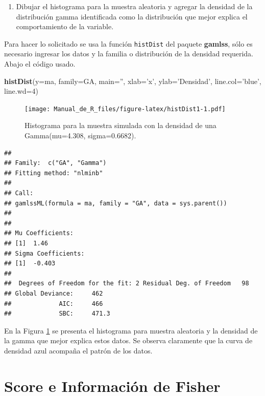 \documentclass[10pt,]{krantz}
\makeatletter
\newenvironment{Shaded}{\begin{snugshade}}{\end{snugshade}}
\newcommand{\KeywordTok}[1]{\textcolor[rgb]{0.13,0.29,0.53}{\textbf{#1}}}
\newcommand{\DataTypeTok}[1]{\textcolor[rgb]{0.13,0.29,0.53}{#1}}
\newcommand{\DecValTok}[1]{\textcolor[rgb]{0.00,0.00,0.81}{#1}}
\newcommand{\StringTok}[1]{\textcolor[rgb]{0.31,0.60,0.02}{#1}}
\newcommand{\NormalTok}[1]{#1}
\providecommand{\tightlist}{%
  \setlength{\itemsep}{0pt}\setlength{\parskip}{0pt}}
\newenvironment{kframe}{%
\medskip{}
\setlength{\fboxsep}{.8em}
 \def\at@end@of@kframe{}%
 \ifinner\ifhmode%
  \def\at@end@of@kframe{\end{minipage}}%
  \begin{minipage}{\columnwidth}%
 \fi\fi%
 \def\FrameCommand##1{\hskip\@totalleftmargin \hskip-\fboxsep
 \colorbox{shadecolor}{##1}\hskip-\fboxsep
     \hskip-\linewidth \hskip-\@totalleftmargin \hskip\columnwidth}%
 \MakeFramed {\advance\hsize-\width
   \@totalleftmargin\z@ \linewidth\hsize
   \@setminipage}}%
 {\par\unskip\endMakeFramed%
 \at@end@of@kframe}
\renewenvironment{Shaded}{\begin{kframe}}{\end{kframe}}
\makeatother
\begin{document}
\begin{enumerate}
\def\labelenumi{\arabic{enumi})}
\setcounter{enumi}{2}
\tightlist
\item
  Dibujar el histograma para la muestra aleatoria y agregar la densidad
  de la distribución gamma identificada como la distribución que mejor
  explica el comportamiento de la variable.
\end{enumerate}

Para hacer lo solicitado se usa la función \texttt{histDist} del paquete
\textbf{gamlss}, sólo es necesario ingresar los datos y la familia o
distribución de la densidad requerida. Abajo el código usado.

\begin{Shaded}
\begin{Highlighting}[]
\KeywordTok{histDist}\NormalTok{(}\DataTypeTok{y=}\NormalTok{ma, }\DataTypeTok{family=}\NormalTok{GA, }\DataTypeTok{main=}\StringTok{''}\NormalTok{, }\DataTypeTok{xlab=}\StringTok{'x'}\NormalTok{, }\DataTypeTok{ylab=}\StringTok{'Densidad'}\NormalTok{,}
         \DataTypeTok{line.col=}\StringTok{'blue'}\NormalTok{, }\DataTypeTok{line.wd=}\DecValTok{4}\NormalTok{)}
\end{Highlighting}
\end{Shaded}

\begin{figure}
\centering
\texttt{[image: Manual\_de\_R\_files/figure-latex/histDist1-1.pdf]}
\caption{\label{fig:histDist1}Histograma para la muestra simulada con la
densidad de una Gamma(mu=4.308, sigma=0.6682).}
\end{figure}

\begin{verbatim}
## 
## Family:  c("GA", "Gamma") 
## Fitting method: "nlminb" 
## 
## Call:  
## gamlssML(formula = ma, family = "GA", data = sys.parent()) 
## 
## 
## Mu Coefficients:
## [1]  1.46
## Sigma Coefficients:
## [1]  -0.403
## 
##  Degrees of Freedom for the fit: 2 Residual Deg. of Freedom   98 
## Global Deviance:     462 
##             AIC:     466 
##             SBC:     471.3
\end{verbatim}

En la Figura \ref{fig:histDist1} se presenta el histograma para muestra
aleatoria y la densidad de la gamma que mejor explica estos datos. Se
observa claramente que la curva de densidad azul acompaña el patrón de
los datos.

\section{Score e Información de
Fisher}\label{score-e-informacion-de-fisher}
\end{document}
